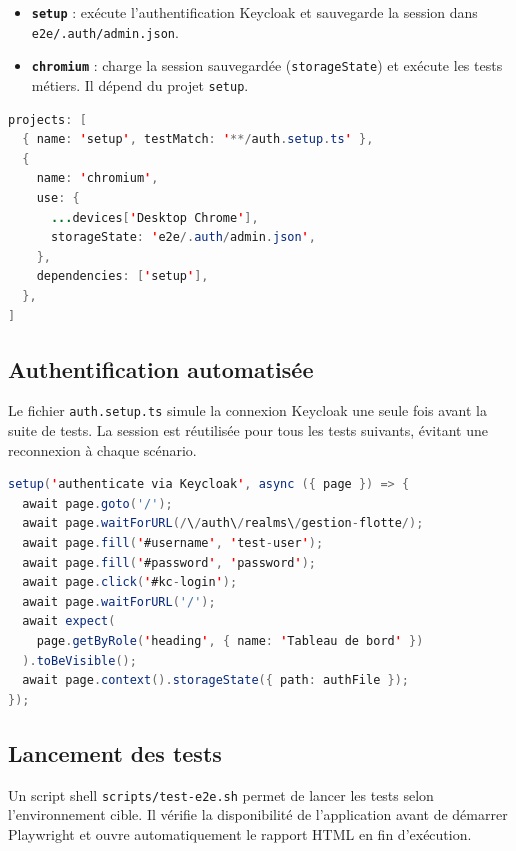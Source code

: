 \documentclass[12pt,a4paper]{article}
\begin{document}
\begin{itemize}[leftmargin=*]
  \item \textbf{\texttt{setup}} : ex\'{e}cute l'authentification Keycloak et sauvegarde la session dans \texttt{e2e/.auth/admin.json}.
  \item \textbf{\texttt{chromium}} : charge la session sauvegard\'{e}e (\texttt{storageState}) et ex\'{e}cute les tests m\'{e}tiers. Il d\'{e}pend du projet \texttt{setup}.
\end{itemize}

\begin{lstlisting}[language=Java, caption=playwright.config.ts --- configuration des projets]
projects: [
  { name: 'setup', testMatch: '**/auth.setup.ts' },
  {
    name: 'chromium',
    use: {
      ...devices['Desktop Chrome'],
      storageState: 'e2e/.auth/admin.json',
    },
    dependencies: ['setup'],
  },
]
\end{lstlisting}

\subsection{Authentification automatis\'{e}e}

Le fichier \texttt{auth.setup.ts} simule la connexion Keycloak une seule fois avant la suite de tests. La session est r\'{e}utilis\'{e}e pour tous les tests suivants, \'{e}vitant une reconnexion \`{a} chaque sc\'{e}nario.

\begin{lstlisting}[language=Java, caption=e2e/tests/auth.setup.ts]
setup('authenticate via Keycloak', async ({ page }) => {
  await page.goto('/');
  await page.waitForURL(/\/auth\/realms\/gestion-flotte/);
  await page.fill('#username', 'test-user');
  await page.fill('#password', 'password');
  await page.click('#kc-login');
  await page.waitForURL('/');
  await expect(
    page.getByRole('heading', { name: 'Tableau de bord' })
  ).toBeVisible();
  await page.context().storageState({ path: authFile });
});
\end{lstlisting}

\subsection{Lancement des tests}

Un script shell \texttt{scripts/test-e2e.sh} permet de lancer les tests selon l'environnement cible. Il v\'{e}rifie la disponibilit\'{e} de l'application avant de d\'{e}marrer Playwright et ouvre automatiquement le rapport HTML en fin d'ex\'{e}cution.
\end{document}
